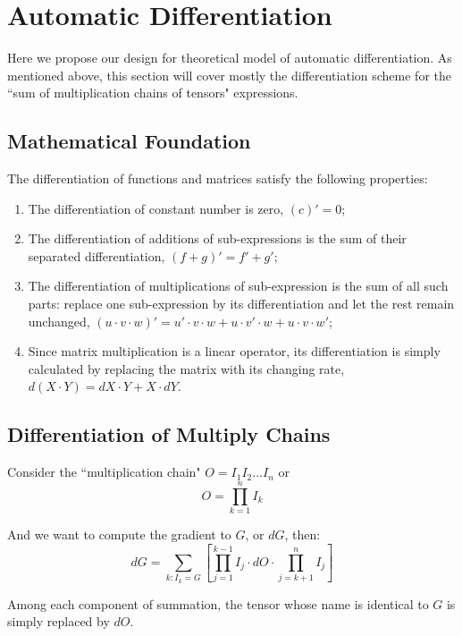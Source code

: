 \documentclass[a4paper,11pt]{article}
\begin{document}
	\section{Automatic Differentiation}
	Here we propose our design for theoretical model of automatic differentiation. As mentioned above, this section will cover mostly the differentiation scheme for the ``sum of multiplication chains of tensors" expressions. 
	\subsection{Mathematical Foundation}
	The differentiation of functions and matrices satisfy the following properties:
	\begin{enumerate}
		\item The differentiation of constant number is zero, $(c)'=0$;
		\item The differentiation of additions of sub-expressions is the sum of their separated differentiation, $(f+g)'=f'+g'$;
		\item The differentiation of multiplications of sub-expression is the sum of all such parts: replace one sub-expression by its differentiation and let the rest remain unchanged, $(u\cdot v\cdot w)' = u'\cdot v\cdot w+u\cdot v'\cdot w+u\cdot v\cdot w'$;
		\item Since matrix multiplication is a linear operator, its differentiation is simply calculated by replacing the matrix with its changing rate, $d(X\cdot Y) = dX\cdot Y + X\cdot dY$.
	\end{enumerate}
	\subsection{Differentiation of Multiply Chains}
	Consider the ``multiplication chain" $O = I_1 I_2 \dots I_n$ or 
	\begin{equation*}
		O = \prod_{k=1}^{n}{I_k}
	\end{equation*}
	\par 
	And we want to compute the gradient to $G$, or $dG$, then:
	\begin{equation*}
		dG = \sum_{k:I_k=G}{\left[\prod_{j=1}^{k-1}{I_j}\cdot dO \cdot \prod_{j=k+1}^{n}{I_j}\right]}
	\end{equation*}
	\par 
	Among each component of summation, the tensor whose name is identical to $G$ is simply replaced by $dO$.
\end{document}
